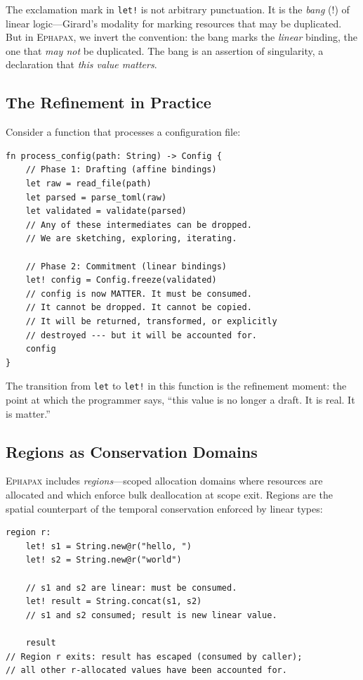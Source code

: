 \documentclass[11pt,a4paper]{article}
\newcommand{\ephapax}{\textsc{Ephapax}}
\newcommand{\letbang}{\texttt{let!}}
\newcommand{\letkw}{\texttt{let}}
\newcommand{\bang}{!}
\begin{document}
The exclamation mark in \letbang{} is not arbitrary punctuation. It
is the \emph{bang} ($\bang$) of linear logic---Girard's modality for
marking resources that may be duplicated. But in \ephapax{}, we
invert the convention: the bang marks the \emph{linear} binding, the
one that \emph{may not} be duplicated. The bang is an assertion of
singularity, a declaration that \emph{this value matters}.

\subsection{The Refinement in Practice}

Consider a function that processes a configuration file:

\begin{lstlisting}
fn process_config(path: String) -> Config {
    // Phase 1: Drafting (affine bindings)
    let raw = read_file(path)
    let parsed = parse_toml(raw)
    let validated = validate(parsed)
    // Any of these intermediates can be dropped.
    // We are sketching, exploring, iterating.

    // Phase 2: Commitment (linear bindings)
    let! config = Config.freeze(validated)
    // config is now MATTER. It must be consumed.
    // It cannot be dropped. It cannot be copied.
    // It will be returned, transformed, or explicitly
    // destroyed --- but it will be accounted for.
    config
}
\end{lstlisting}

The transition from \letkw{} to \letbang{} in this function is the
refinement moment: the point at which the programmer says, ``this
value is no longer a draft. It is real. It is matter.''

\subsection{Regions as Conservation Domains}

\ephapax{} includes \emph{regions}---scoped allocation domains where
resources are allocated and which enforce bulk deallocation at scope
exit. Regions are the spatial counterpart of the temporal conservation
enforced by linear types:

\begin{lstlisting}
region r:
    let! s1 = String.new@r("hello, ")
    let! s2 = String.new@r("world")

    // s1 and s2 are linear: must be consumed.
    let! result = String.concat(s1, s2)
    // s1 and s2 consumed; result is new linear value.

    result
// Region r exits: result has escaped (consumed by caller);
// all other r-allocated values have been accounted for.
\end{lstlisting}
\end{document}
